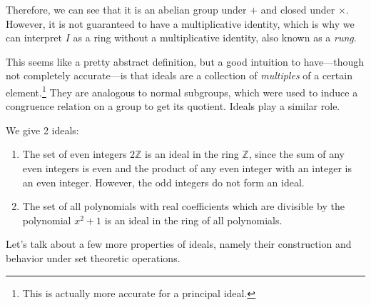   Therefore, we can see that it is an abelian group under $+$ and closed under $\times$. However, it is not guaranteed to have a multiplicative identity, which is why we can interpret $I$ as a ring without a multiplicative identity, also known as a \textit{rung}. 

  This seems like a pretty abstract definition, but a good intuition to have---though not completely accurate---is that ideals are a collection of \textit{multiples} of a certain element.\footnote{This is actually more accurate for a principal ideal.} They are analogous to normal subgroups, which were used to induce a congruence relation on a group to get its quotient. Ideals play a similar role. 

  \begin{example}
    We give 2 ideals: 
    \begin{enumerate}
      \item The set of even integers $2 \mathbb{Z}$ is an ideal in the ring $\mathbb{Z}$, since the sum of any even integers is even and the product of any even integer with an integer is an even integer. However, the odd integers do not form an ideal. 
      \item The set of all polynomials with real coefficients which are divisible by the polynomial $x^2 + 1$ is an ideal in the ring of all polynomials. 
    \end{enumerate}
  \end{example}

  Let's talk about a few more properties of ideals, namely their construction and behavior under set theoretic operations. 

